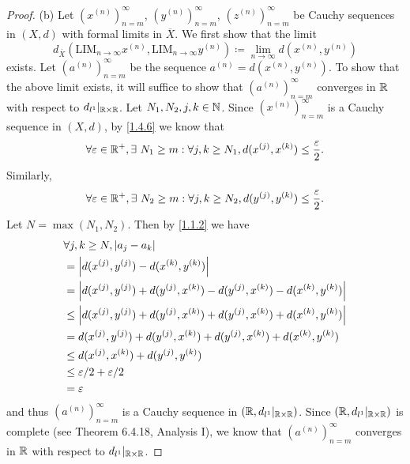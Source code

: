 \begin{proof}{(b)}
  Let \((x^{(n)})_{n = m}^\infty\), \((y^{(n)})_{n = m}^\infty\), \((z^{(n)})_{n = m}^\infty\) be Cauchy sequences in \((X, d)\) with formal limits in \(\overline{X}\).
  We first show that the limit
  \[
    d_{\overline{X}}(\text{LIM}_{n \to \infty} x^{(n)}, \text{LIM}_{n \to \infty} y^{(n)}) \coloneqq \lim_{n \to \infty} d(x^{(n)}, y^{(n)})
  \]
  exists.
  Let \((a^{(n)})_{n = m}^\infty\) be the sequence \(a^{(n)} = d(x^{(n)}, y^{(n)})\).
  To show that the above limit exists, it will suffice to show that \((a^{(n)})_{n = m}^\infty\) converges in \(\mathbb{R}\) with respect to \(d_{l^1}|_{\mathbb{R} \times \mathbb{R}}\).
  Let \(N_1, N_2, j, k \in \mathbb{N}\).
  Since \((x^{(n)})_{n = m}^\infty\) is a Cauchy sequence in \((X, d)\), by \cref{1.4.6} we know that
  \[
    \forall \varepsilon \in \mathbb{R}^+, \exists\ N_1 \geq m : \forall j, k \geq N_1, d(x^{(j)}, x^{(k)}) \leq \frac{\varepsilon}{2}.
  \]
  Similarly,
  \[
    \forall \varepsilon \in \mathbb{R}^+, \exists\ N_2 \geq m : \forall j, k \geq N_2, d(y^{(j)}, y^{(k)}) \leq \frac{\varepsilon}{2}.
  \]
  Let \(N = \max(N_1, N_2)\).
  Then by \cref{1.1.2} we have
  \begin{align*}
     & \forall j, k \geq N, \left\lvert a_j - a_k\right\rvert                                                             \\
     & = \left\lvert d(x^{(j)}, y^{(j)}) - d(x^{(k)}, y^{(k)})\right\rvert                                                \\
     & = \left\lvert d(x^{(j)}, y^{(j)}) + d(y^{(j)}, x^{(k)}) - d(y^{(j)}, x^{(k)}) - d(x^{(k)}, y^{(k)})\right\rvert    \\
     & \leq \left\lvert d(x^{(j)}, y^{(j)}) + d(y^{(j)}, x^{(k)}) + d(y^{(j)}, x^{(k)}) + d(x^{(k)}, y^{(k)})\right\rvert \\
     & = d(x^{(j)}, y^{(j)}) + d(y^{(j)}, x^{(k)}) + d(y^{(j)}, x^{(k)}) + d(x^{(k)}, y^{(k)})          \\
     & \leq d(x^{(j)}, x^{(k)}) + d(y^{(j)}, y^{(k)})                                                   \\
     & \leq \varepsilon / 2 + \varepsilon / 2                                                           \\
     & = \varepsilon
  \end{align*}
  and thus \((a^{(n)})_{n = m}^\infty\) is a Cauchy sequence in \((\mathbb{R}, d_{l^1}|_{\mathbb{R} \times \mathbb{R}})\).
  Since \((\mathbb{R}, d_{l^1}|_{\mathbb{R} \times \mathbb{R}})\) is complete (see Theorem 6.4.18, Analysis I), we know that \((a^{(n)})_{n = m}^\infty\) converges in \(\mathbb{R}\) with respect to \(d_{l^1}|_{\mathbb{R} \times \mathbb{R}}\).


\end{proof}
